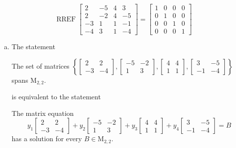 \begin{exerciseAnswer} 


\[\operatorname{RREF} \left[\begin{array}{cccc}
2 & -5 & 4 & 3 \\
2 & -2 & 4 & -5 \\
-3 & 1 & 1 & -1 \\
-4 & 3 & 1 & -4
\end{array}\right] = \left[\begin{array}{cccc}
1 & 0 & 0 & 0 \\
0 & 1 & 0 & 0 \\
0 & 0 & 1 & 0 \\
0 & 0 & 0 & 1
\end{array}\right] \]


\begin{enumerate}[(a)]
\item The statement 
\begin{center}\begin{minipage}{0.8\textwidth}
 The set of matrices \( \left\{ \left[\begin{array}{cc}
2 & 2 \\
-3 & -4
\end{array}\right] , \left[\begin{array}{cc}
-5 & -2 \\
1 & 3
\end{array}\right] , \left[\begin{array}{cc}
4 & 4 \\
1 & 1
\end{array}\right] , \left[\begin{array}{cc}
3 & -5 \\
-1 & -4
\end{array}\right] \right\} \) spans \(\mathrm{M}_{2,2}\). 
\end{minipage}\end{center}
     is equivalent to the statement 
\begin{center}\begin{minipage}{0.8\textwidth}
 The matrix equation \[ y_{1} \left[\begin{array}{cc}
2 & 2 \\
-3 & -4
\end{array}\right] + y_{2} \left[\begin{array}{cc}
-5 & -2 \\
1 & 3
\end{array}\right] + y_{3} \left[\begin{array}{cc}
4 & 4 \\
1 & 1
\end{array}\right] + y_{4} \left[\begin{array}{cc}
3 & -5 \\
-1 & -4
\end{array}\right] =B\] has a solution for every \(B \in \mathrm{M}_{2,2}\). 
\end{minipage}\end{center}
    

\end{enumerate}
\end{exerciseAnswer}
